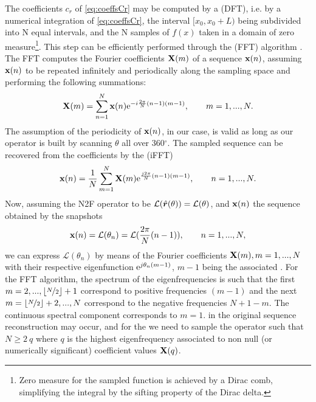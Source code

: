 \par The coefficients $c_r$ of \eqref{eq:coeffsCr} may be computed by a  (DFT), i.e. by a numerical integration of \eqref{eq:coeffsCr}, the interval $[x_0,x_0+L)$ being subdivided into N equal intervals, and the N samples of $f(x)$ taken in a domain of zero measure\footnote{Zero measure for the sampled function is achieved by a Dirac comb, simplifying the integral by the sifting property of the Dirac delta.}. This step can be efficiently performed through the  (FFT) algorithm \cite{BrighamFFT}. The FFT computes the Fourier coefficients $\mathbf{X}(m)$ of a sequence $\mathbf{x}(n)$, assuming $\mathbf{x}(n)$ to be repeated infinitely and periodically along the sampling space and performing the following summations:
\begin{equation}
\mathbf{X}(m) = \sum_{n=1}^{N} \mathbf{x}(n) \mathrm{e}^{- i \frac{2\pi}{N} (n-1) (m-1)}, \qquad m = 1, ..., N.
\end{equation}
The assumption of the periodicity of $\mathbf{x}(n)$, in our case, is valid as long as our operator is built by scanning $\theta$ all over 360\ensuremath{^\circ}.
The sampled sequence can be recovered from the coefficients by the  (iFFT)
\begin{equation}
\mathbf{x}(n) = \frac{1}{N} \sum_{m=1}^{N} \mathbf{X}(m) \mathrm{e}^{\frac{j2\pi}{N}(n-1)(m-1)}, \qquad n = 1, ..., N.
\end{equation}
Now, assuming the N2F operator to be $\mathcal{L}(\hat{\mbfit{r}}(\theta)) = \mathcal{L}(\theta)$, and $\mathbf{x}(n)$ the sequence obtained by the snapshots $$\mathbf{x}(n) = \mathcal{L}(\theta_n) = \mathcal{L}(\frac{2\pi}{N}(n-1)), \qquad n = 1, ..., N,$$ we can express $\mathcal{L}(\theta_n)$ by means of the Fourier coefficients $\mathbf{X}(m),  m = 1, ..., N$ with their respective eigenfunction $\mathrm{e}^{j\theta_n (m-1)}$, $m-1$ being the associated . For the FFT algorithm, the spectrum of the eigenfrequencies is such that the first $m = 2, ..., \lfloor\nicefrac{N}{2}\rfloor+1$ correspond to positive frequencies $(m-1)$ and the next $m = \lfloor\nicefrac{N}{2}\rfloor+2, ...,  N$ correspond to the negative frequencies $N+1-m$. The continuous spectral component corresponds to $m=1$.  \cite{BrighamFFT} in the original sequence reconstruction may occur, and for the  we need to sample the operator such that $N \geq 2 \ q$ where $q$ is the highest eigenfrequency associated to non null (or numerically significant) coefficient values $\mathbf{X}(q)$.

